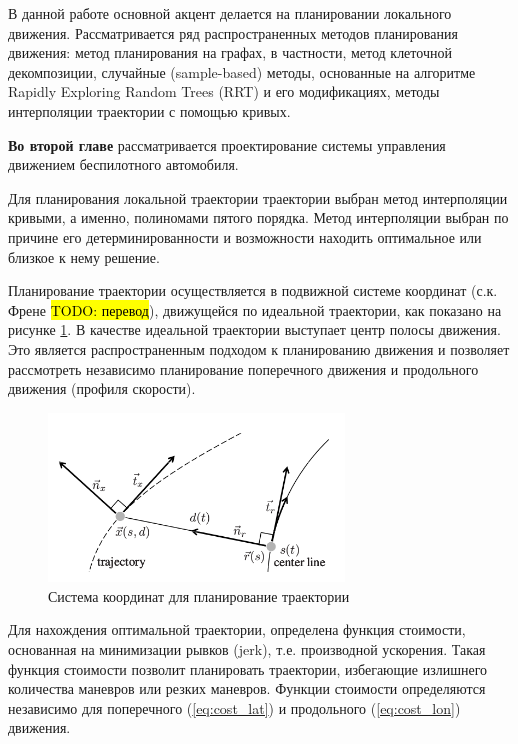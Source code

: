 В данной работе основной акцент делается на планировании локального движения. Рассматривается ряд распространенных
методов планирования движения: метод планирования на графах, в частности, метод клеточной декомпозиции, случайные 
(sample-based) методы, основанные на алгоритме Rapidly Exploring Random Trees (RRT) и его модификациях, методы 
интерполяции траектории с помощью кривых.

\textbf{Во второй главе} рассматривается проектирование системы управления движением беспилотного автомобиля. 

Для планирования локальной траектории траектории выбран метод интерполяции кривыми, а именно, полиномами
пятого порядка. Метод интерполяции выбран по причине его детерминированности и возможности находить оптимальное
или близкое к нему решение. 

Планирование траектории осуществляется в подвижной системе координат (с.к. Френе \hl{TODO: перевод}), 
движущейся по идеальной траектории, как показано на рисунке \ref{img:junior_frenet_frame}. В качестве
идеальной траектории  выступает центр полосы движения. Это является распространенным подходом к
планированию движения и позволяет рассмотреть независимо планирование поперечного движения и
продольного движения (профиля скорости).

\begin{figure}[h]
    \centering
    \includegraphics[width=0.7\textwidth]{images/junior_frenet_frame}
    \caption{Система координат для планирование траектории}
    \label{img:junior_frenet_frame}
\end{figure}

Для нахождения оптимальной траектории, определена функция стоимости, основанная на минимизации рывков
(jerk), т.е. производной ускорения. Такая функция стоимости позволит планировать траектории, избегающие
излишнего количества маневров или резких маневров. Функции стоимости определяются независимо для
поперечного (\ref{eq:cost_lat}) и продольного (\ref{eq:cost_lon}) движения.

